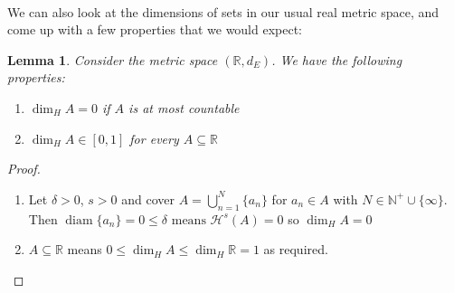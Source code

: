 \documentclass{article}
\theoremstyle{plain}
\newtheorem{lem}[thm]{Lemma}
\theoremstyle{definition}
\newtheorem{defn}[thm]{Definition}
\DeclareMathOperator{\diam}{diam}
\theoremstyle{remark}
\begin{document}
~\\We can also look at the dimensions of sets in our usual real metric space, and come up with a few properties that we would expect:

\begin{lem} Consider the metric space $(\mathbb{R}, d_E)$. We have the following properties:
\begin{enumerate}
    \item $\dim_H A=0$ if $A$ is at most countable
    \item $\dim_H A \in [0,1]$ for every $A \subseteq \mathbb{R}$
\end{enumerate}
\end{lem}

\begin{proof} $ $
    \begin{enumerate}
        \item Let $\delta >0$, $s>0$ and cover $A = \bigcup \limits _{n=1}^N \{a_n\}$ for $a_n\in A$ with $N \in {\mathbb{N}^+} \cup \{\infty\}$. Then $\diam \{a_n\}=0\le \delta \text{ means } \mathcal{H}^s(A)=0$ so $\dim_H A=0$

        \item $A \subseteq \mathbb{R}$ means $0 \le \dim_H A \le \dim_H \mathbb{R} = 1$ as required.

    \end{enumerate}    
    
\end{proof}

\newpage


\end{document}
